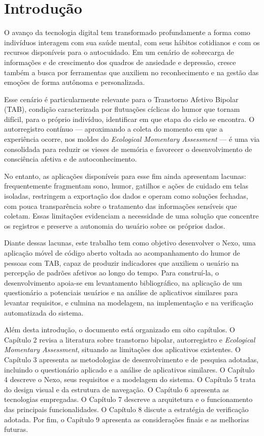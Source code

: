 \chapter{Introdução}

O avanço da tecnologia digital tem transformado profundamente a forma como
indivíduos interagem com sua saúde mental, com seus hábitos cotidianos e com os
recursos disponíveis para o autocuidado. Em um cenário de sobrecarga de
informações e de crescimento dos quadros de ansiedade e depressão, cresce
também a busca por ferramentas que auxiliem no reconhecimento e na gestão das
emoções de forma autônoma e personalizada.

Esse cenário é particularmente relevante para o Transtorno Afetivo Bipolar
(TAB), condição caracterizada por flutuações cíclicas do humor que tornam
difícil, para o próprio indivíduo, identificar em que etapa do ciclo se
encontra. O autorregistro contínuo --- aproximando a coleta do momento em que a
experiência ocorre, nos moldes do \textit{Ecological Momentary Assessment} ---
é uma via consolidada para reduzir os vieses de memória e favorecer o
desenvolvimento de consciência afetiva e de autoconhecimento.

No entanto, as aplicações disponíveis para esse fim ainda apresentam lacunas:
frequentemente fragmentam sono, humor, gatilhos e ações de cuidado em telas
isoladas, restringem a exportação dos dados e operam como soluções fechadas,
com pouca transparência sobre o tratamento das informações sensíveis que
coletam. Essas limitações evidenciam a necessidade de uma solução que concentre
os registros e preserve a autonomia do usuário sobre os próprios dados.

Diante dessas lacunas, este trabalho tem como objetivo desenvolver o Nexo, uma
aplicação móvel de código aberto voltada ao acompanhamento do humor de pessoas
com TAB, capaz de produzir indicadores que auxiliem o usuário na percepção de
padrões afetivos ao longo do tempo. Para construí-la, o desenvolvimento
apoia-se em levantamento bibliográfico, na aplicação de um questionário a
potenciais usuários e na análise de aplicativos similares para levantar
requisitos, e culmina na modelagem, na implementação e na verificação
automatizada do sistema.

Além desta introdução, o documento está organizado em oito capítulos. O
Capítulo 2 revisa a literatura sobre transtorno bipolar, autorregistro e
\textit{Ecological Momentary Assessment}, situando as limitações dos
aplicativos existentes. O Capítulo 3 apresenta as metodologias de
desenvolvimento e de pesquisa adotadas, incluindo o questionário aplicado e a
análise de aplicativos similares. O Capítulo 4 descreve o Nexo, seus requisitos
e a modelagem do sistema. O Capítulo 5 trata do design visual e da estrutura de
navegação. O Capítulo 6 apresenta as tecnologias empregadas. O Capítulo 7
descreve a arquitetura e o funcionamento das principais funcionalidades. O
Capítulo 8 discute a estratégia de verificação adotada. Por fim, o Capítulo 9
apresenta as considerações finais e as melhorias futuras.
